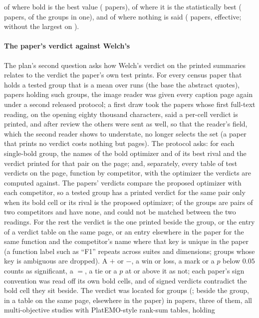 \documentclass[preprint,review,12pt]{elsarticle}
\begin{document}
\nCrcBoldBestFailCi{} of \nCrcBoldBestTested{} where bold is the best value (\nCrcBoldBestTestedPapers{} papers), \nCrcBoldStatisticallyBestFail{} of \nCrcBoldStatisticallyBestTested{} where it is the statistically best (\nCrcBoldStatisticallyBestTestedPapers{} papers, \nCrcBoldStatisticallyBestLargestTested{} of the groups in one), and \nCrcBoldNotStatedFail{} of \nCrcBoldNotStatedTested{} where nothing is said (\nCrcBoldNotStatedTestedPapers{} papers, \nCrcBoldNotStatedTestedEffective{} effective; without the largest \nCrcBoldNotStatedWithoutLargestFail{} on \nCrcBoldNotStatedWithoutLargestTested{}).

\paragraph{The paper's verdict against Welch's} The plan's second question asks how Welch's verdict on the printed summaries relates to the verdict the paper's own test prints. For every census paper that holds a tested group that is a mean over runs (the base the abstract quotes), \nVcPapers{} papers holding \nVcTestedGroups{} such groups, the image reader was given every caption page again under a second released protocol; a first draw took the \nVcPapersFirstDraw{} papers whose first full-text reading, on the opening eighty thousand characters, said a per-cell verdict is printed, and after review the \nVcPapersSecondDraw{} others were sent as well, so that the reader's field, which the second reader shows to understate, no longer selects the set (a paper that prints no verdict costs nothing but pages). The protocol asks: for each single-bold group, the names of the bold optimizer and of its best rival and the verdict printed for that pair on the page; and, separately, every table of test verdicts on the page, function by competitor, with the optimizer the verdicts are computed against. The papers' verdicts compare the proposed optimizer with each competitor, so a tested group has a printed verdict for the same pair only when its bold cell or its rival is the proposed optimizer; \nVcStatusDifferentPair{} of the \nVcTestedGroups{} groups are pairs of two competitors and have none, and \nVcStatusGroupNotMatched{} could not be matched between the two readings. For the rest the verdict is the one printed beside the group, or the entry of a verdict table on the same page, or an entry elsewhere in the paper for the same function and the competitor's name where that key is unique in the paper (a function label such as ``F1'' repeats across suites and dimensions; \nVcStatusAmbiguousKey{} groups whose key is ambiguous are dropped). A $+$ or $-$, a win or loss, a mark or a $p$ below $0.05$ counts as significant, a $=$, a tie or a $p$ at or above it as not; each paper's sign convention was read off its own bold cells, and \nVcSignContradictions{} of \nVcSignChecked{} signed verdicts contradict the bold cell they sit beside. The verdict was located for \nVcLocated{} groups (\nVcPctLocated{}; \nVcSourceBesideGroup{} beside the group, \nVcSourceSamePageTable{} in a table on the same page, \nVcSourceVerdictTable{} elsewhere in the paper) in \nVcPapersLocated{} papers, three of them, all multi-objective studies with PlatEMO-style rank-sum tables, holding 
\end{document}
